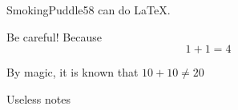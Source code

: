 \documentclass{article}
\begin{document}
\begin{expbox}
    \begin{example}
        SmokingPuddle58 can do LaTeX.
    \end{example}
\end{expbox}

\begin{warnbox}
    \begin{warning}
        Be careful! Because $$1+1=4$$
    \end{warning}
\end{warnbox}

\begin{warnbox}
    \begin{remark}
        By magic, it is known that $10+10\neq 20$
    \end{remark}
\end{warnbox}

\begin{notebox}
    \begin{note}
        Useless notes
    \end{note}
\end{notebox}
\end{document}
